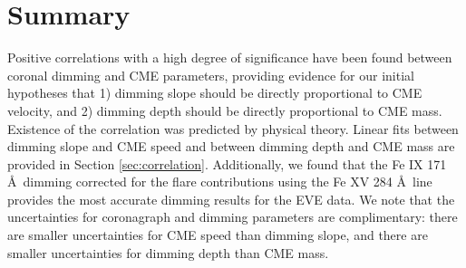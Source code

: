 \section{Summary} 
\label{sec:chapter5summary}
Positive correlations with a high degree of significance have been found between coronal dimming and CME parameters, providing evidence for our initial hypotheses that 1) dimming slope should be directly proportional to CME velocity, and 2) dimming depth should be directly proportional to CME mass. Existence of the correlation was predicted by physical theory. Linear fits between dimming slope and CME speed and between dimming depth and CME mass are provided in Section \ref{sec:correlation}. Additionally, we found that the Fe IX 171 \AA\ dimming corrected for the flare contributions using the Fe XV 284 \AA\ line provides the most accurate dimming results for the EVE data. We note that the uncertainties for coronagraph and dimming parameters are complimentary: there are smaller uncertainties for CME speed than dimming slope, and there are smaller uncertainties for dimming depth than CME mass.